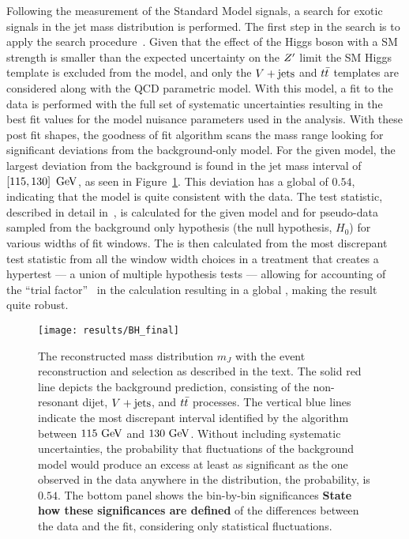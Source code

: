 Following the measurement of the Standard Model signals, a search for exotic signals in the \largeR jet mass distribution is performed.
The first step in the search is to apply the \BumpHunter{} search procedure~\cite{Aaltonen:2008vt,Choudalakis:2011qn}.
Given that the effect of the Higgs boson with a SM strength is smaller than the expected uncertainty on the $Z'$ limit the SM Higgs template is excluded from the model, and only the $V + \text{jets}$ and $t\bar{t}$ templates are considered along with the QCD parametric model.
With this model, a fit to the data is performed with the full set of systematic uncertainties resulting in the best fit values for the model nuisance parameters used in the analysis.
With these post fit shapes, the \BumpHunter{} goodness of fit algorithm scans the mass range looking for significant deviations from the background-only model.
For the given model, the largest deviation from the background is found in the \largeR jet mass interval of $\left[115,130\right]~\mathrm{GeV}$, as seen in Figure~\ref{fig:BumpHunter_scan}.
This deviation has a \BumpHunter{} global \pvalue{} of $0.54$, indicating that the model is quite consistent with the data.
The \BumpHunter{} test statistic, described in detail in~\cite{Choudalakis:2011qn}, is calculated for the given model and for pseudo-data sampled from the background only hypothesis (the null hypothesis, $H_{0}$) for various widths of fit windows.
The \BumpHunter{} \pvalue{} is then calculated from the most discrepant test statistic from all the window width choices in a treatment that creates a hypertest --- a union of multiple hypothesis tests --- allowing for accounting of the ``trial factor''~\cite{Gross:2010qma} in the calculation resulting in a global \pvalue{}, making the result quite robust.\\

\begin{figure}[htbp]
 \centering
 \texttt{[image: results/BH\_final]}
 \caption{The reconstructed mass distribution $m_{J}$ with the event reconstruction and selection as described in the text.
  The solid red line depicts the background prediction, consisting of the non-resonant dijet, $V + \text{jets}$, and $t\bar{t}$ processes.
  The vertical blue lines indicate the most discrepant interval identified by the \BumpHunter{} algorithm between $115~\mathrm{GeV}$ and $130~\mathrm{GeV}$.
  Without including systematic uncertainties, the probability that fluctuations of the background model would produce an excess at least as significant as the one observed in the data anywhere in the distribution, the \BumpHunter{} probability, is $0.54$.
  The bottom panel shows the bin-by-bin significances \textbf{\TODO{} State how these significances are defined} of the differences between the data and the fit, considering only statistical fluctuations.
 }
 \label{fig:BumpHunter_scan}
\end{figure}


